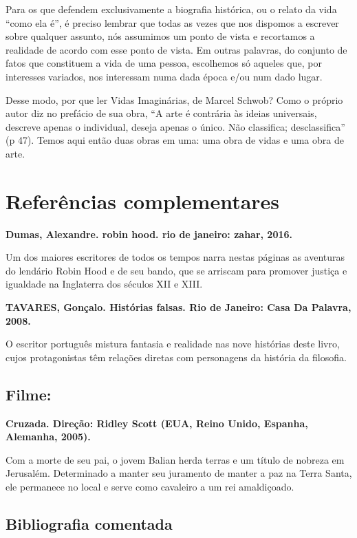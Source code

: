 \documentclass[12pt]{extarticle}
\begin{document}
Para os que defendem exclusivamente a biografia histórica, ou o relato
da vida ``como ela é'', é preciso lembrar que todas as vezes que nos
dispomos a escrever sobre qualquer assunto, nós assumimos um ponto de
vista e recortamos a realidade de acordo com esse ponto de vista. Em
outras palavras, do conjunto de fatos que constituem a vida de uma
pessoa, escolhemos só aqueles que, por interesses variados, nos
interessam numa dada época e/ou num dado lugar.

Desse modo, por que ler Vidas Imaginárias, de Marcel Schwob? Como o
próprio autor diz no prefácio de sua obra, ``A arte é contrária às
ideias universais, descreve apenas o individual, deseja apenas o único.
Não classifica; desclassifica'' (p 47). Temos aqui então duas obras em
uma: uma obra de vidas e uma obra de arte.


\section{Referências complementares}

\textbf{Dumas, Alexandre. robin hood. rio de janeiro: zahar, 2016.}

Um dos maiores escritores de todos os tempos narra nestas páginas as
aventuras do lendário Robin Hood e de seu bando, que se arriscam para
promover justiça e igualdade na Inglaterra dos séculos XII e XIII.

\textbf{TAVARES, Gonçalo. Histórias falsas. Rio de Janeiro: Casa Da
Palavra, 2008.}

O escritor português mistura fantasia e realidade nas nove histórias
deste livro, cujos protagonistas têm relações diretas com personagens da
história da filosofia.

\subsection{Filme: }

\textbf{Cruzada. Direção: Ridley Scott (EUA, Reino Unido, Espanha,
Alemanha, 2005).}

Com a morte de seu pai, o jovem Balian herda terras e um título de
nobreza em Jerusalém. Determinado a manter seu juramento de manter a paz
na Terra Santa, ele permanece no local e serve como cavaleiro a um rei
amaldiçoado.

\subsection{Bibliografia comentada}
\end{document}
